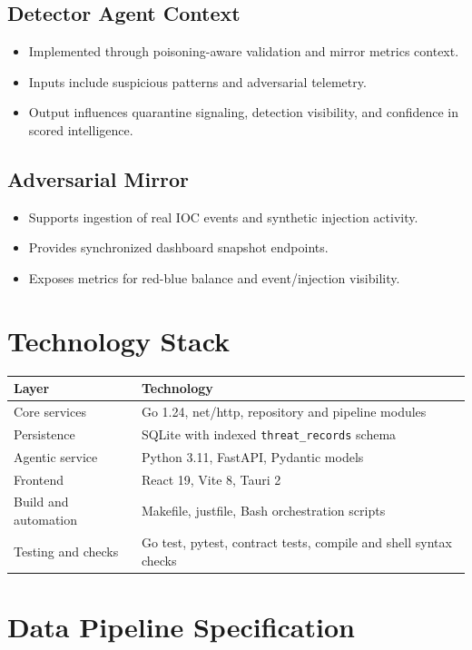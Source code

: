 \documentclass[11pt,a4paper]{article}
\begin{document}
\subsection{Detector Agent Context}
\begin{itemize}[leftmargin=1.5em]
  \item Implemented through poisoning-aware validation and mirror metrics context.
  \item Inputs include suspicious patterns and adversarial telemetry.
  \item Output influences quarantine signaling, detection visibility, and confidence in scored intelligence.
\end{itemize}

\subsection{Adversarial Mirror}
\begin{itemize}[leftmargin=1.5em]
  \item Supports ingestion of real IOC events and synthetic injection activity.
  \item Provides synchronized dashboard snapshot endpoints.
  \item Exposes metrics for red-blue balance and event/injection visibility.
\end{itemize}

\section{Technology Stack}
\begin{longtable}{p{} p{}}
\toprule
\textbf{Layer} & \textbf{Technology} \\
\midrule
Core services & Go 1.24, net/http, repository and pipeline modules \\
Persistence & SQLite with indexed \texttt{threat\_records} schema \\
Agentic service & Python 3.11, FastAPI, Pydantic models \\
Frontend & React 19, Vite 8, Tauri 2 \\
Build and automation & Makefile, justfile, Bash orchestration scripts \\
Testing and checks & Go test, pytest, contract tests, compile and shell syntax checks \\
\bottomrule
\end{longtable}

\section{Data Pipeline Specification}
\end{document}

